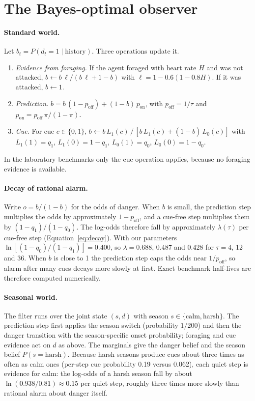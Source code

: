 \documentclass[11pt]{article}
\begin{document}
\section{The Bayes-optimal observer}
\label{app:observer}

\paragraph{Standard world.} Let $b_t=P(d_t=1\mid\text{history})$. Three operations update it.
\begin{enumerate}
\item \emph{Evidence from foraging.} If the agent foraged with heart rate $H$ and was not attacked, $b \leftarrow b\,\ell/(b\,\ell+1-b)$ with $\ell=1-0.6(1-0.8H)$. If it was attacked, $b\leftarrow 1$.
\item \emph{Prediction.} $\bar b = b\,(1-p_{\text{off}}) + (1-b)\,p_{\text{on}}$, with $p_{\text{off}}=1/\tau$ and $p_{\text{on}}=p_{\text{off}}\,\pi/(1-\pi)$.
\item \emph{Cue.} For cue $c\in\{0,1\}$, $b \leftarrow \bar b\,L_1(c)\,/\,[\bar b\,L_1(c)+(1-\bar b)\,L_0(c)]$ with $L_1(1)=q_1$, $L_1(0)=1-q_1$, $L_0(1)=q_0$, $L_0(0)=1-q_0$.
\end{enumerate}
In the laboratory benchmarks only the cue operation applies, because no foraging evidence is available.

\paragraph{Decay of rational alarm.} Write $o=b/(1-b)$ for the odds of danger. When $b$ is small, the prediction step multiplies the odds by approximately $1-p_{\text{off}}$, and a cue-free step multiplies them by $(1-q_1)/(1-q_0)$. The log-odds therefore fall by approximately $\lambda(\tau)$ per cue-free step (Equation~\ref{eq:decay}). With our parameters $\ln[(1-q_0)/(1-q_1)]=0.400$, so $\lambda=0.688$, $0.487$ and $0.428$ for $\tau=4$, 12 and 36. When $b$ is close to 1 the prediction step caps the odds near $1/p_{\text{off}}$, so alarm after many cues decays more slowly at first. Exact benchmark half-lives are therefore computed numerically.

\paragraph{Seasonal world.} The filter runs over the joint state $(s,d)$ with season $s\in\{\text{calm},\text{harsh}\}$. The prediction step first applies the season switch (probability $1/200$) and then the danger transition with the season-specific onset probability; foraging and cue evidence act on $d$ as above. The marginals give the danger belief and the season belief $P(s=\text{harsh})$. Because harsh seasons produce cues about three times as often as calm ones (per-step cue probability 0.19 versus 0.062), each quiet step is evidence for calm: the log-odds of a harsh season fall by about $\ln(0.938/0.81)\approx 0.15$ per quiet step, roughly three times more slowly than rational alarm about danger itself.
\end{document}

